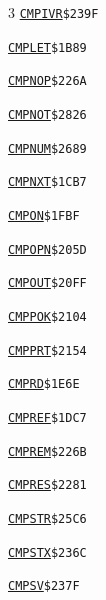 \begin{multicols}{3}
\noindent\hyperlink{l:CMPIVR}{\texttt{CMPIVR}}\hfill\texttt{\$239F~\phantom{000}\llap{\pageref{l:CMPIVR}}}\par
\noindent\hyperlink{l:CMPLET}{\texttt{CMPLET}}\hfill\texttt{\$1B89~\phantom{000}\llap{\pageref{l:CMPLET}}}\par
\noindent\hyperlink{l:CMPNOP}{\texttt{CMPNOP}}\hfill\texttt{\$226A~\phantom{000}\llap{\pageref{l:CMPNOP}}}\par
\noindent\hyperlink{l:CMPNOT}{\texttt{CMPNOT}}\hfill\texttt{\$2826~\phantom{000}\llap{\pageref{l:CMPNOT}}}\par
\noindent\hyperlink{l:CMPNUM}{\texttt{CMPNUM}}\hfill\texttt{\$2689~\phantom{000}\llap{\pageref{l:CMPNUM}}}\par
\noindent\hyperlink{l:CMPNXT}{\texttt{CMPNXT}}\hfill\texttt{\$1CB7~\phantom{000}\llap{\pageref{l:CMPNXT}}}\par
\noindent\hyperlink{l:CMPON}{\texttt{CMPON}}\hfill\texttt{\$1FBF~\phantom{000}\llap{\pageref{l:CMPON}}}\par
\noindent\hyperlink{l:CMPOPN}{\texttt{CMPOPN}}\hfill\texttt{\$205D~\phantom{000}\llap{\pageref{l:CMPOPN}}}\par
\noindent\hyperlink{l:CMPOUT}{\texttt{CMPOUT}}\hfill\texttt{\$20FF~\phantom{000}\llap{\pageref{l:CMPOUT}}}\par
\noindent\hyperlink{l:CMPPOK}{\texttt{CMPPOK}}\hfill\texttt{\$2104~\phantom{000}\llap{\pageref{l:CMPPOK}}}\par
\noindent\hyperlink{l:CMPPRT}{\texttt{CMPPRT}}\hfill\texttt{\$2154~\phantom{000}\llap{\pageref{l:CMPPRT}}}\par
\noindent\hyperlink{l:CMPRD}{\texttt{CMPRD}}\hfill\texttt{\$1E6E~\phantom{000}\llap{\pageref{l:CMPRD}}}\par
\noindent\hyperlink{l:CMPREF}{\texttt{CMPREF}}\hfill\texttt{\$1DC7~\phantom{000}\llap{\pageref{l:CMPREF}}}\par
\noindent\hyperlink{l:CMPREM}{\texttt{CMPREM}}\hfill\texttt{\$226B~\phantom{000}\llap{\pageref{l:CMPREM}}}\par
\noindent\hyperlink{l:CMPRES}{\texttt{CMPRES}}\hfill\texttt{\$2281~\phantom{000}\llap{\pageref{l:CMPRES}}}\par
\noindent\hyperlink{l:CMPSTR}{\texttt{CMPSTR}}\hfill\texttt{\$25C6~\phantom{000}\llap{\pageref{l:CMPSTR}}}\par
\noindent\hyperlink{l:CMPSTX}{\texttt{CMPSTX}}\hfill\texttt{\$236C~\phantom{000}\llap{\pageref{l:CMPSTX}}}\par
\noindent\hyperlink{l:CMPSV}{\texttt{CMPSV}}\hfill\texttt{\$237F~\phantom{000}\llap{\pageref{l:CMPSV}}}\par

\end{multicols}
